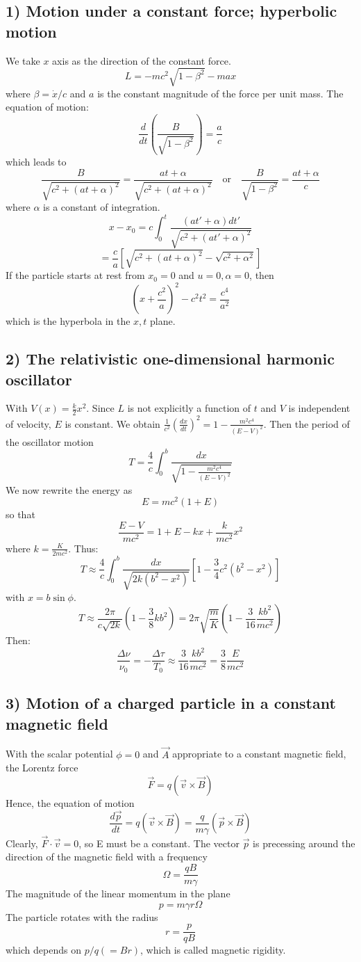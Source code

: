\documentclass{article}
\begin{document}
    \subsection*{1) Motion under a constant force; hyperbolic motion}
    We take $x$ axis as the direction of the constant force.
    $$ L = -mc^2 \sqrt{1-\beta^2} - max $$
    where $\beta = \dot{x}/c$ and $a$ is the constant magnitude of the force per unit mass.
    The equation of motion:
    $$ \frac{d}{dt} \left( \frac{B}{\sqrt{1-\beta^2}} \right) = \frac{a}{c} $$
    which leads to
    $$ \frac{B}{\sqrt{c^2 + (at+\alpha)^2}} = \frac{at+\alpha}{\sqrt{c^2 + (at+\alpha)^2}} \quad \text{or} \quad \frac{B}{\sqrt{1-\beta^2}} = \frac{at+\alpha}{c} $$
    where $\alpha$ is a constant of integration.
    $$ x - x_0 = c \int_0^t \frac{(at'+\alpha)dt'}{\sqrt{c^2 + (at'+\alpha)^2}} $$
    $$ = \frac{c}{a} [ \sqrt{c^2+(at+\alpha)^2} - \sqrt{c^2+\alpha^2} ] $$
    If the particle starts at rest from $x_0=0$ and $u=0, \alpha=0$, then
    $$ (x+\frac{c^2}{a})^2 - c^2t^2 = \frac{c^4}{a^2} $$
    which is the hyperbola in the $x,t$ plane.
    
    \subsection*{2) The relativistic one-dimensional harmonic oscillator}
    With $V(x) = \frac{k}{2}x^2$.
    Since $L$ is not explicitly a function of $t$ and $V$ is independent of velocity, $E$ is constant.
    We obtain $\frac{1}{c^2}(\frac{dx}{dt})^2 = 1 - \frac{m^2c^4}{(E-V)^2}$.
    Then the period of the oscillator motion
    $$ T = \frac{4}{c} \int_0^b \frac{dx}{\sqrt{1 - \frac{m^2c^4}{(E-V)^2}}} $$
    We now rewrite the energy as
    $$ E = mc^2(1+E) $$
    so that
    $$ \frac{E-V}{mc^2} = 1+E-kx+\frac{k}{mc^2}x^2 $$
    where $k=\frac{K}{2mc^2}$.
    Thus:
    $$ T \approx \frac{4}{c} \int_0^b \frac{dx}{\sqrt{2k(b^2-x^2)}} [1 - \frac{3}{4}c^2(b^2-x^2)] $$
    with $x = b \sin\phi$.
    $$ T \approx \frac{2\pi}{c\sqrt{2k}} (1-\frac{3}{8}kb^2) = 2\pi\sqrt{\frac{m}{K}} (1-\frac{3}{16}\frac{kb^2}{mc^2}) $$
    Then:
    $$ \frac{\Delta\nu}{\nu_0} = -\frac{\Delta\tau}{T_0} \approx \frac{3}{16}\frac{kb^2}{mc^2} = \frac{3}{8} \frac{E}{mc^2} $$
    
    \subsection*{3) Motion of a charged particle in a constant magnetic field}
    With the scalar potential $\phi=0$ and $\vec{A}$ appropriate to a constant magnetic field, the Lorentz force
    $$ \vec{F} = q(\vec{v} \times \vec{B}) $$
    Hence, the equation of motion
    $$ \frac{d\vec{p}}{dt} = q(\vec{v} \times \vec{B}) = \frac{q}{m\gamma}(\vec{p} \times \vec{B}) $$
    Clearly, $\vec{F} \cdot \vec{v} = 0$, so E must be a constant.
    The vector $\vec{p}$ is precessing around the direction of the magnetic field with a frequency
    $$ \Omega = \frac{qB}{m\gamma} $$
    The magnitude of the linear momentum in the plane
    $$ p = m\gamma r \Omega $$
    The particle rotates with the radius
    $$ r = \frac{p}{qB} $$
    which depends on $p/q (=Br)$, which is called magnetic rigidity.
\end{document}
